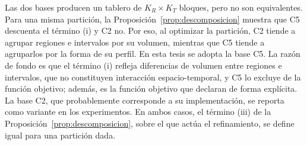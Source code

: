 Las dos bases producen un tablero de $K_R \times K_T$ bloques, pero no son
equivalentes. Para una misma partición, la Proposición~\ref{prop:descomposicion} muestra que C5 descuenta
el término (i) y C2 no. Por eso, al optimizar la partición, C2 tiende a agrupar
regiones e intervalos por su volumen, mientras que C5 tiende a agruparlos por la
forma de su perfil.
En esta tesis se adopta la base C5. La razón de fondo es que el término (i)
refleja diferencias de volumen entre regiones e intervalos, que no constituyen
interacción espacio-temporal, y C5 lo excluye de la función objetivo; además, es
la función objetivo que \cite{Liu2021} declaran de forma explícita. La base C2,
que probablemente corresponde a su implementación, se reporta como variante en los
experimentos. En ambos casos, el término (iii) de la Proposición~\ref{prop:descomposicion}, sobre el que
actúa el refinamiento, se define igual para una partición dada.

